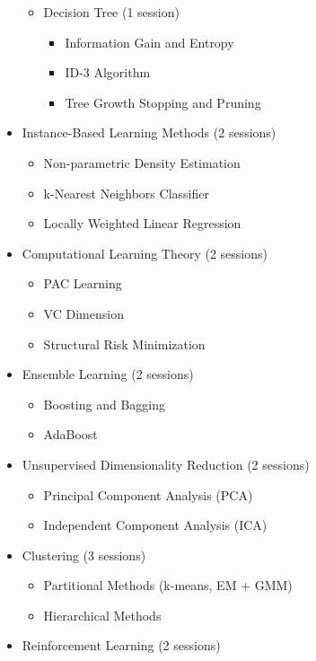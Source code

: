 \documentclass[12pt]{article}
\begin{document}
\begin{itemize}
\begin{itemize}
\begin{itemize}
        \end{itemize}
        \item Decision Tree (1 session)
        \begin{itemize}
            \item Information Gain and Entropy
            \item ID-3 Algorithm
            \item Tree Growth Stopping and Pruning
        \end{itemize}
    \end{itemize}
    \item Instance-Based Learning Methods (2 sessions)
    \begin{itemize}
        \item Non-parametric Density Estimation
        \item k-Nearest Neighbors Classifier
        \item Locally Weighted Linear Regression
    \end{itemize}
    \item Computational Learning Theory (2 sessions)
    \begin{itemize}
        \item PAC Learning
        \item VC Dimension
        \item Structural Risk Minimization
    \end{itemize}
    \item Ensemble Learning (2 sessions)
    \begin{itemize}
        \item Boosting and Bagging
        \item AdaBoost
    \end{itemize}
    \item Unsupervised Dimensionality Reduction (2 sessions)
    \begin{itemize}
        \item Principal Component Analysis (PCA)
        \item Independent Component Analysis (ICA)
    \end{itemize}
    \item Clustering (3 sessions)
    \begin{itemize}
        \item Partitional Methods (k-means, EM + GMM)
        \item Hierarchical Methods
    \end{itemize}
    \item Reinforcement Learning (2 sessions)

\end{itemize}
\end{document}
